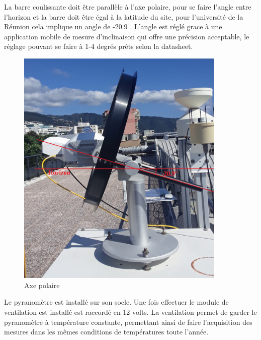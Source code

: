 \documentclass[12pt,a4paper]{article}
\begin{document}
\begin{flushleft}
La barre coulissante doit être parallèle à l'axe polaire, pour se faire l'angle entre l'horizon et la barre doit être égal à la latitude du site, pour l'université de la Réunion cela implique un angle de -20.9$^\circ$. L'angle est réglé grace à une application mobile de mesure d'inclinaison qui offre une précision acceptable, le réglage pouvant se faire à 1-4 degrés prêts selon la datasheet.

\begin{figure}[H]
\centering
\includegraphics[width=10cm]{image/montage/3.jpg} 
\caption{Axe polaire}
\end{figure}


Le pyranomètre est installé sur son socle. Une fois effectuer le module de ventilation est installé est raccordé en 12 volts. La ventilation permet de garder le pyranomètre à température constante, permettant ainsi de faire l'acquisition des mesures dans les mêmes conditions de températures toute l'année.


\end{flushleft}
\end{document}
